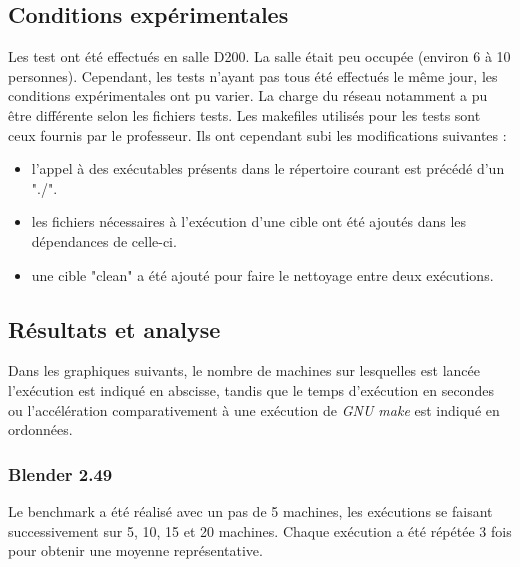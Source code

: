 \documentclass[a4paper,12pt,twoside]{article}
\begin{document}
\subsection{Conditions expérimentales}

Les test ont été effectués en salle D200. La salle était peu occupée
(environ 6 à 10 personnes). Cependant, les tests n'ayant pas tous été
effectués le même jour, les conditions expérimentales ont pu
varier. La charge du réseau notamment a pu être différente selon les
fichiers tests. Les makefiles utilisés pour les tests sont ceux
fournis par le professeur. Ils ont cependant subi les modifications
suivantes : 
\begin{itemize}
\item l'appel à des exécutables présents dans le répertoire courant est
  précédé d'un "./".
\item les fichiers nécessaires à l'exécution d'une cible ont été
  ajoutés dans les dépendances de celle-ci.
\item une cible "clean" a été ajouté pour faire le nettoyage entre deux exécutions.
\end{itemize}

\subsection{Résultats et analyse}

Dans les graphiques suivants, le nombre de machines sur lesquelles est
lancée l'exécution est indiqué en abscisse, tandis que le temps
d'exécution en secondes ou l'accélération comparativement à une
exécution de \emph{GNU make} est indiqué en ordonnées.

\subsubsection{Blender 2.49}

Le benchmark a été réalisé avec un pas de 5 machines, les exécutions
se faisant successivement sur 5, 10, 15 et 20 machines. Chaque
exécution a été répétée 3 fois pour obtenir une moyenne
représentative.
\end{document}
